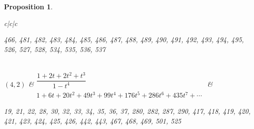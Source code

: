 \documentclass[10pt,a4paper]{amsart}
\newtheorem{prop}[thm]{Proposition}
\theoremstyle{definition}
\numberwithin{equation}{section}
\begin{document}
\begin{prop}
\begin{table}[h!]
\begin{tabu}{c|c|c}
\begin{minipage}{4cm}
 466, 481, 482, 483, 484, 485, 486, 487, 488, 489,
 490, 491, 492, 493, 494, 495, 526, 527, 528, 534,
 535, 536, 537
 \end{minipage}
\\
\hline
$(4,2)$\label{T(2,4)}
&$\begin{array}{c}
	 \dfrac{1+2t+2t^2+t^3}{1-t^4} \\[10pt]
	 {1+6t+20t^2+49t^3+99t^4+176t^5+286t^6+435t^7+\cdots}
\end{array}$
& \begin{minipage}{4cm} \rm
 19, 21, 22, 28, 30, 32, 33, 34, 35, 36,
	 37, 280, 282, 287, 290, 417, 418, 419, 420, 421,
	 423, 424, 425, 426, 442, 443, 467, 468, 469, 501,
	 525
 \end{minipage}
\\
\hline
\end{tabu}%
\end{table}


\end{prop}
\end{document}
